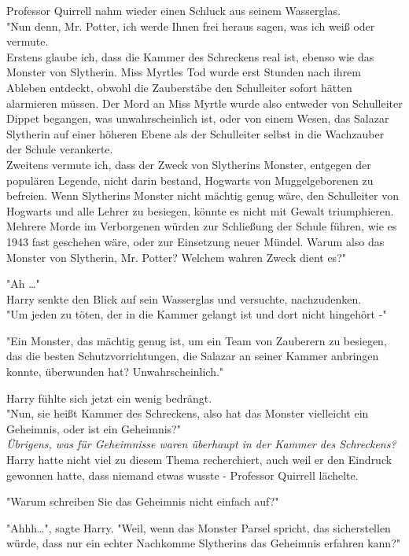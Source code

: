 {Professor Quirrell nahm wieder einen Schluck aus seinem Wasserglas.\\ "Nun denn, Mr. Potter, ich werde Ihnen frei heraus sagen, was ich weiß oder vermute.\\ Erstens glaube ich, dass die Kammer des Schreckens real ist, ebenso wie das Monster von Slytherin. Miss Myrtles Tod wurde erst Stunden nach ihrem Ableben entdeckt, obwohl die Zauberstäbe den Schulleiter sofort hätten alarmieren müssen. Der Mord an Miss Myrtle wurde also entweder von Schulleiter Dippet begangen, was unwahrscheinlich ist, oder von einem Wesen, das Salazar Slytherin auf einer höheren Ebene als der Schulleiter selbst in die Wachzauber der Schule verankerte.\\ Zweitens vermute ich, dass der Zweck von Slytherins Monster, entgegen der populären Legende, nicht darin bestand, Hogwarts von Muggelgeborenen zu befreien. Wenn Slytherins Monster nicht mächtig genug wäre, den Schulleiter von Hogwarts und alle Lehrer zu besiegen, könnte es nicht mit Gewalt triumphieren.\\ Mehrere Morde im Verborgenen würden zur Schließung der Schule führen, wie es 1943 fast geschehen wäre, oder zur Einsetzung neuer Mündel. Warum also das Monster von Slytherin, Mr. Potter? Welchem wahren Zweck dient es?"

"Ah …"\\ Harry senkte den Blick auf sein Wasserglas und versuchte, nachzudenken.\\ "Um jeden zu töten, der in die Kammer gelangt ist und dort nicht hingehört -"

"Ein Monster, das mächtig genug ist, um ein Team von Zauberern zu besiegen, das die besten Schutzvorrichtungen, die Salazar an seiner Kammer anbringen konnte, überwunden hat? Unwahrscheinlich."

Harry fühlte sich jetzt ein wenig bedrängt.\\ "Nun, sie heißt Kammer des Schreckens, also hat das Monster vielleicht ein Geheimnis, oder ist ein Geheimnis?"\\ \emph{Übrigens, was für Geheimnisse waren überhaupt in der Kammer des Schreckens?} Harry hatte nicht viel zu diesem Thema recherchiert, auch weil er den Eindruck gewonnen hatte, dass niemand etwas wusste - Professor Quirrell lächelte.

"Warum schreiben Sie das Geheimnis nicht einfach auf?"

"Ahhh…", sagte Harry. "Weil, wenn das Monster Parsel spricht, das sicherstellen würde, dass nur ein echter Nachkomme Slytherins das Geheimnis erfahren kann?"

}
